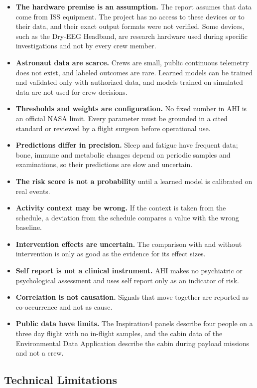 \begin{itemize}
\item \textbf{The hardware premise is an assumption.} The report assumes that data come from ISS equipment. The project has no access to these devices or to their data, and their exact output formats were not verified. Some devices, such as the Dry-EEG Headband, are research hardware used during specific investigations and not by every crew member.
\item \textbf{Astronaut data are scarce.} Crews are small, public continuous telemetry does not exist, and labeled outcomes are rare. Learned models can be trained and validated only with authorized data, and models trained on simulated data are not used for crew decisions.
\item \textbf{Thresholds and weights are configuration.} No fixed number in AHI is an official NASA limit. Every parameter must be grounded in a cited standard or reviewed by a flight surgeon before operational use.
\item \textbf{Predictions differ in precision.} Sleep and fatigue have frequent data; bone, immune and metabolic changes depend on periodic samples and examinations, so their predictions are slow and uncertain.
\item \textbf{The risk score is not a probability} until a learned model is calibrated on real events.
\item \textbf{Activity context may be wrong.} If the context is taken from the schedule, a deviation from the schedule compares a value with the wrong baseline.
\item \textbf{Intervention effects are uncertain.} The comparison with and without intervention is only as good as the evidence for its effect sizes.
\item \textbf{Self report is not a clinical instrument.} AHI makes no psychiatric or psychological assessment and uses self report only as an indicator of risk.
\item \textbf{Correlation is not causation.} Signals that move together are reported as co-occurrence and not as cause.
\item \textbf{Public data have limits.} The Inspiration4 panels describe four people on a three day flight with no in-flight samples, and the cabin data of the Environmental Data Application describe the cabin during payload missions and not a crew.
\end{itemize}

\subsection{Technical Limitations}
\label{subsec:technical-limitations}

